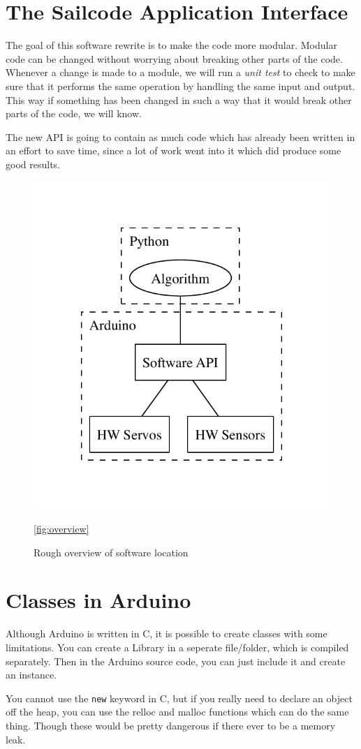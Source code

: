 \documentclass[letterpaper]{article}
\begin{document}
\section{The Sailcode Application Interface} %
\label{sec:The Sailcode Application Interface}

The goal of this software rewrite is to make the code more modular. Modular code can be changed without worrying about breaking other parts of the code. Whenever a change is made to a module, we will run a \emph{unit test} to check to make sure that it performs the same operation by handling the same input and output. This way if something has been changed in such a way that it would break other parts of the code, we will know.

The new API is going to contain as much code which has already been written in an effort to save time, since a lot of work went into it which did produce some good results.

\begin{figure}[h]
	\centering
	\includegraphics[width=0.8\linewidth]{mindmap_test/overview.pdf}
	\caption{Rough overview of software location}
	\ref{fig:overview}
\end{figure}


\section{Classes in Arduino} %
\label{sec:Classes in Arduino}

Although Arduino is written in C, it is possible to create classes with some limitations. You can create a Library in a seperate file/folder, which is compiled separately. Then in the Arduino source code, you can just include it and create an instance.

You cannot use the \verb:new: keyword in C, but if you really need to declare an object off the heap, you can use the relloc and malloc functions which can do the same thing. Though these would be pretty dangerous if there ever to be a memory leak.

\end{document}
